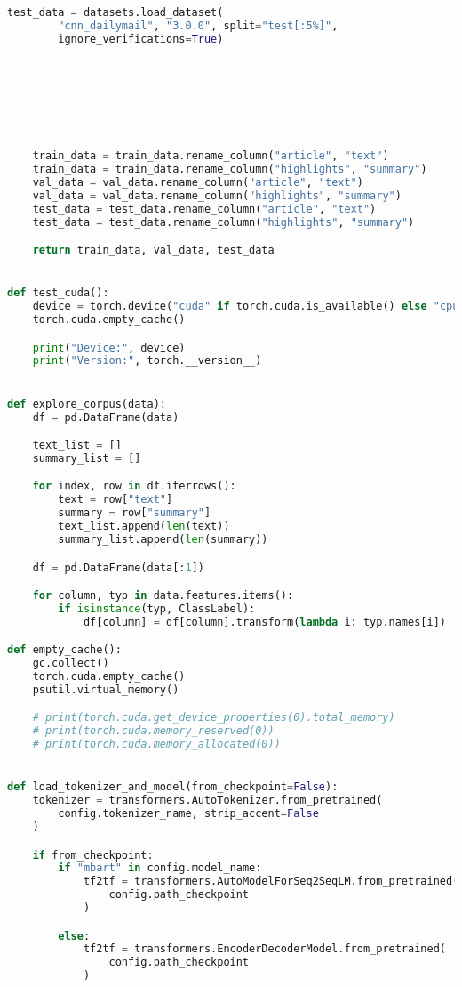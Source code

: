 \begin{lstlisting}[language=Python, caption=Hilfsmethoden]
    test_data = datasets.load_dataset(
        "cnn_dailymail", "3.0.0", split="test[:5%]",
        ignore_verifications=True)







    train_data = train_data.rename_column("article", "text")
    train_data = train_data.rename_column("highlights", "summary")
    val_data = val_data.rename_column("article", "text")
    val_data = val_data.rename_column("highlights", "summary")
    test_data = test_data.rename_column("article", "text")
    test_data = test_data.rename_column("highlights", "summary")

    return train_data, val_data, test_data


def test_cuda():
    device = torch.device("cuda" if torch.cuda.is_available() else "cpu")
    torch.cuda.empty_cache()

    print("Device:", device)
    print("Version:", torch.__version__)


def explore_corpus(data):
    df = pd.DataFrame(data)

	text_list = []
    summary_list = []

    for index, row in df.iterrows():
        text = row["text"]
        summary = row["summary"]
        text_list.append(len(text))
        summary_list.append(len(summary))

    df = pd.DataFrame(data[:1])

    for column, typ in data.features.items():
        if isinstance(typ, ClassLabel):
            df[column] = df[column].transform(lambda i: typ.names[i])

def empty_cache():
    gc.collect()
    torch.cuda.empty_cache()
    psutil.virtual_memory()

    # print(torch.cuda.get_device_properties(0).total_memory)
    # print(torch.cuda.memory_reserved(0))
    # print(torch.cuda.memory_allocated(0))


def load_tokenizer_and_model(from_checkpoint=False):
    tokenizer = transformers.AutoTokenizer.from_pretrained(
        config.tokenizer_name, strip_accent=False
    )

    if from_checkpoint:
        if "mbart" in config.model_name:
            tf2tf = transformers.AutoModelForSeq2SeqLM.from_pretrained(
                config.path_checkpoint
            )

        else:
            tf2tf = transformers.EncoderDecoderModel.from_pretrained(
                config.path_checkpoint
            )


\end{lstlisting}
